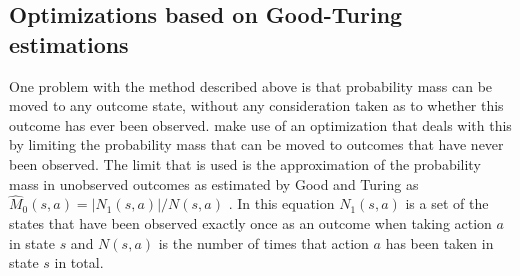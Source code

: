 \subsection{Optimizations based on Good-Turing estimations}

\label{sec:mbie_gt}

One problem with the method described above is that probability mass can be
moved to any outcome state, without any consideration taken as to whether this
outcome has ever been observed. \textcite{dietterich2013pac} make
use of an optimization that deals with this by limiting the probability mass
that can be moved to outcomes that have never been observed. The limit that is used is the approximation
of the probability mass in unobserved outcomes as estimated by Good and Turing
as $\hat{M}_0(s,a) = |N_1(s,a)| / N(s,a)$ \parencite{gtpaper}. In this
equation $N_1(s,a)$ is a set of the states that have been observed exactly
once as an outcome when taking action $a$ in state $s$ and $N(s,a)$ is the
number of times that action $a$ has been taken in state $s$ in total. 